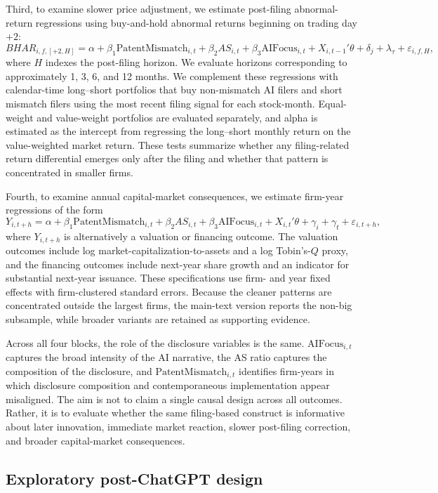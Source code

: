 Third, to examine slower price adjustment, we estimate post-filing abnormal-return regressions using buy-and-hold abnormal returns beginning on trading day $+2$:
\[
BHAR_{i,f,[+2,H]}
=
\alpha + \beta_1 \mathrm{PatentMismatch}_{i,t}
+ \beta_2 AS_{i,t}
+ \beta_3 \mathrm{AI Focus}_{i,t}
+ X_{i,t-1}'\theta + \delta_{j} + \lambda_{\tau} + \varepsilon_{i,f,H},
\]
where $H$ indexes the post-filing horizon. We evaluate horizons corresponding to approximately 1, 3, 6, and 12 months. We complement these regressions with calendar-time long--short portfolios that buy non-mismatch AI filers and short mismatch filers using the most recent filing signal for each stock-month. Equal-weight and value-weight portfolios are evaluated separately, and alpha is estimated as the intercept from regressing the long--short monthly return on the value-weighted market return. These tests summarize whether any filing-related return differential emerges only after the filing and whether that pattern is concentrated in smaller firms.

Fourth, to examine annual capital-market consequences, we estimate firm-year regressions of the form
\[
Y_{i,t+h}
=
\alpha + \beta_1 \mathrm{PatentMismatch}_{i,t}
+ \beta_2 AS_{i,t}
+ \beta_3 \mathrm{AI Focus}_{i,t}
+ X_{i,t}'\theta + \gamma_i + \gamma_t + \varepsilon_{i,t+h},
\]
where $Y_{i,t+h}$ is alternatively a valuation or financing outcome. The valuation outcomes include log market-capitalization-to-assets and a log Tobin's-$Q$ proxy, and the financing outcomes include next-year share growth and an indicator for substantial next-year issuance. These specifications use firm- and year fixed effects with firm-clustered standard errors. Because the cleaner patterns are concentrated outside the largest firms, the main-text version reports the non-big subsample, while broader variants are retained as supporting evidence.

Across all four blocks, the role of the disclosure variables is the same. $\mathrm{AI Focus}_{i,t}$ captures the broad intensity of the AI narrative, the AS ratio captures the composition of the disclosure, and $\mathrm{PatentMismatch}_{i,t}$ identifies firm-years in which disclosure composition and contemporaneous implementation appear misaligned. The aim is not to claim a single causal design across all outcomes. Rather, it is to evaluate whether the same filing-based construct is informative about later innovation, immediate market reaction, slower post-filing correction, and broader capital-market consequences.

\subsection{Exploratory post-ChatGPT design}

